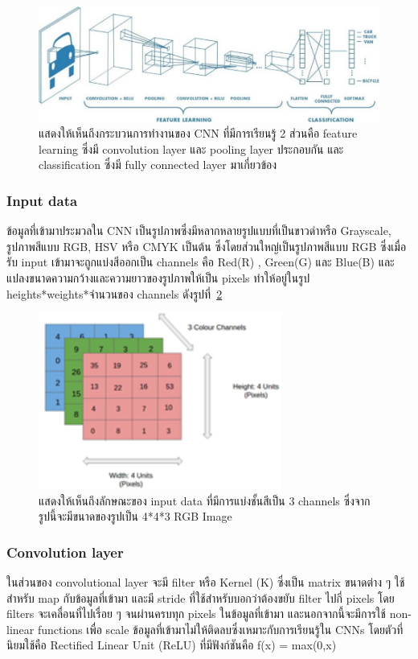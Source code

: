 \documentclass[12pt,oneside,openright,a4paper]{cpe-thai-project}
\begin{document}
\begin{figure}[!h]
  \centering
  \includegraphics[width=12cm]{./image/cnn.jpg}
  \caption{แสดงให้เห็นถึงกระบวนการทำงานของ CNN ที่มีการเรียนรู้ 2 ส่วนคือ feature learning ซึ่งมี convolution layer และ pooling layer ประกอบกัน และ classification ซึ่งมี fully connected layer มาเกี่ยวข้อง}
  \label{fig:pic-cnn}
\end{figure}


\subsubsection{Input data}
\par\setlength{\parindent}{5ex}
ข้อมูลที่เข้ามาประมวลใน CNN เป็นรูปภาพซึ่งมีหลากหลายรูปแบบที่เป็นขาวดำหรือ Grayscale, รูปภาพสีแบบ RGB, HSV หรือ CMYK เป็นต้น ซึ่งโดยส่วนใหญ่เป็นรูปภาพสีแบบ RGB ซึ่งเมื่อรับ input เข้ามาจะถูกแบ่งสีออกเป็น channels คือ Red(R) , Green(G) และ Blue(B) และแปลงขนาดความกว้างและความยาวของรูปภาพให้เป็น pixels 
ทำให้อยู่ในรูป heights*weights*จำนวนของ channels ดังรูปที่~\ref{fig:rgb-layer}

\begin{figure}[!h]
  \centering
  \includegraphics[width=8cm]{./image/unit3.png}
  \caption{แสดงให้เห็นถึงลักษณะของ input data ที่มีการแบ่งชั้นสีเป็น 3 channels ซึ่งจากรูปนี้จะมีขนาดของรูปเป็น 4*4*3 RGB Image}
  \label{fig:rgb-layer}
\end{figure}

\subsubsection{Convolution layer}
\par\setlength{\parindent}{5ex}
ในส่วนของ convolutional layer จะมี filter หรือ Kernel (K) ซึ่งเป็น matrix ขนาดต่าง ๆ ใช้สำหรับ map กับข้อมูลที่เข้ามา และมี stride ที่ใช้สำหรับบอกว่าต้องขยับ filter ไปกี่ pixels โดย filters จะเคลื่อนที่ไปเรื่อย ๆ จนผ่านครบทุก pixels ในข้อมูลที่เข้ามา และนอกจากนี้จะมีการใช้ non-linear functions เพื่อ scale ข้อมูลที่เข้ามาไม่ให้ติดลบซึ่งเหมาะกับการเรียนรู้ใน CNNs โดยตัวที่นิยมใช้คือ Rectified Linear Unit (ReLU) ที่มีฟังก์ชันคือ ƒ(x) = max(0,x) 
\end{document}
